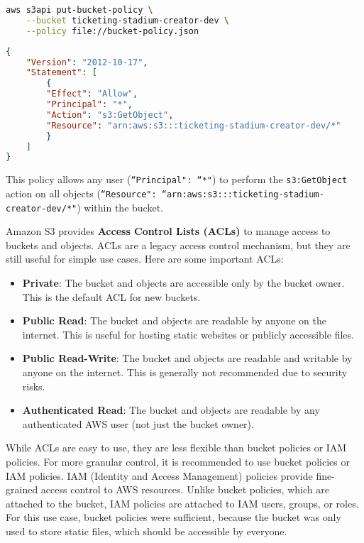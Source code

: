 \begin{lstlisting}[language=bash, caption={AWS CLI Command to Set a Bucket Policy}, label={lst:aws-cli-bucket-policy}]
aws s3api put-bucket-policy \
    --bucket ticketing-stadium-creator-dev \
    --policy file://bucket-policy.json
\end{lstlisting}

\begin{lstlisting}[language=json,caption=Bucket Policy JSON Configuration, label=lst:bucket-policy]
{
    "Version": "2012-10-17",
    "Statement": [
        {
        "Effect": "Allow",
        "Principal": "*",
        "Action": "s3:GetObject",
        "Resource": "arn:aws:s3:::ticketing-stadium-creator-dev/*"
        }
    ]
}
\end{lstlisting}

This policy allows any user (\texttt{``Principal": ``*"}) to perform the \texttt{s3:GetObject} action on all objects (\texttt{``Resource": ``arn:aws:s3:::ticketing-stadium-creator-dev/*"}) within the bucket.

Amazon S3 provides \textbf{Access Control Lists (ACLs)} to manage access to buckets and objects. ACLs are a legacy access control mechanism, but they are still useful for simple use cases. Here are some important ACLs:

\begin{itemize}
    \item \textbf{Private}: The bucket and objects are accessible only by the bucket owner. This is the default ACL for new buckets.
    \item \textbf{Public Read}: The bucket and objects are readable by anyone on the internet. This is useful for hosting static websites or publicly accessible files.
    \item \textbf{Public Read-Write}: The bucket and objects are readable and writable by anyone on the internet. This is generally not recommended due to security risks.
    \item \textbf{Authenticated Read}: The bucket and objects are readable by any authenticated AWS user (not just the bucket owner).
\end{itemize}

While ACLs are easy to use, they are less flexible than bucket policies or IAM policies. For more granular control, it is recommended to use bucket policies or IAM policies. IAM (Identity and Access Management) policies provide fine-grained access control to AWS resources. Unlike bucket policies, which are attached to the bucket, IAM policies are attached to IAM users, groups, or roles. For this use case, bucket policies were sufficient, because the bucket was only used to store static files, which should be accessible by everyone.